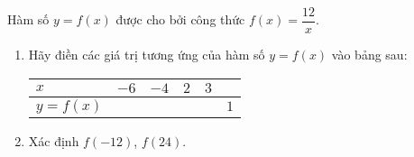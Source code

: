 \begin{vd}%
Hàm số $y=f(x)$ được cho bởi công thức $f(x)=\dfrac{12}{x}$.
\begin{enumerate}
\item Hãy điền các giá trị tương ứng của hàm số $y=f(x)$ vào bảng sau:
\begin{center}
 \begin{tabular}{|>{\centering\arraybackslash}p{2.5cm}|>{\centering\arraybackslash}p{1cm}|>{\centering\arraybackslash}p{1cm}|>{\centering\arraybackslash}p{1cm}|>{\centering\arraybackslash}p{1cm}|>{\centering\arraybackslash}p{1cm}|}
\hline 
$x$ & $-6$ & $-4$ & $2$ & $3$ &  \\ 
\hline 
$y=f(x)$ &  &  &  &  & $1$ \\ 
\hline 
\end{tabular}
 \end{center} 
\item Xác định $f(-12)$, $f(24)$.
\end{enumerate}
\end{vd}
